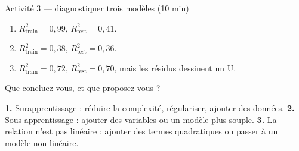 \begin{frame}{Activité 3 --- diagnostiquer trois modèles (10 min)}
\begin{abox}
\begin{enumerate}
  \item $R^2_{\text{train}}=0{,}99$, $R^2_{\text{test}}=0{,}41$.
  \item $R^2_{\text{train}}=0{,}38$, $R^2_{\text{test}}=0{,}36$.
  \item $R^2_{\text{train}}=0{,}72$, $R^2_{\text{test}}=0{,}70$, mais les résidus
        dessinent un U.
\end{enumerate}
Que concluez-vous, et que proposez-vous ?
\end{abox}
\vspace{1mm}
\begin{solbox}[Réponses]
\textbf{1.} Surapprentissage : réduire la complexité, régulariser, ajouter des
données. \textbf{2.} Sous-apprentissage : ajouter des variables ou un modèle
plus souple. \textbf{3.} La relation n'est pas linéaire : ajouter des termes
quadratiques ou passer à un modèle non linéaire.
\end{solbox}
\end{frame}

